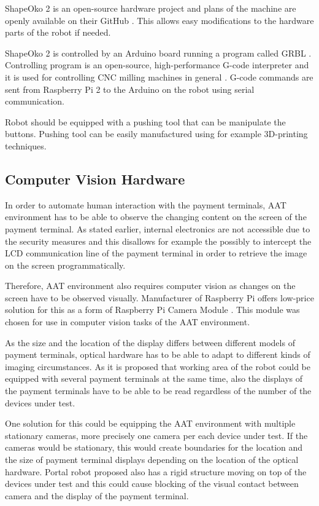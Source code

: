 ShapeOko 2 is an open-source hardware project and plans of the machine are openly available on their GitHub \citep{shapeoko_git}. This allows easy modifications to the hardware parts of the robot if needed.

ShapeOko 2 is controlled by an Arduino board running a program called GRBL \citep{grbl}. Controlling program is an open-source, high-performance G-code interpreter and it is used for controlling CNC milling machines in general \citep{shapeoko}. G-code commands are sent from Raspberry Pi 2 to the Arduino on the robot using serial communication.

Robot should be equipped with a pushing tool that can be manipulate the buttons. Pushing tool can be easily manufactured using for example 3D-printing techniques.

\FloatBarrier
\subsection{Computer Vision Hardware}
\label{subsection:computer vision hardware}

In order to automate human interaction with the payment terminals, AAT environment has to be able to observe the changing content on the screen of the payment terminal. As stated earlier, internal electronics are not accessible due to the security measures and this disallows for example the possibly to intercept the LCD communication line of the payment terminal in order to retrieve the image on the screen programmatically.

Therefore, AAT environment also requires computer vision as changes on the screen have to be observed visually. Manufacturer of Raspberry Pi offers low-price solution for this as a form of Raspberry Pi Camera Module \citep{raspberry_camera}. This module was chosen for use in computer vision tasks of the AAT environment.

As the size and the location of the display differs between different models of payment terminals, optical hardware has to be able to adapt to different kinds of imaging circumstances. As it is proposed that working area of the robot could be equipped with several payment terminals at the same time, also the displays of the payment terminals have to be able to be read regardless of the number of the devices under test.

One solution for this could be equipping the AAT environment with multiple stationary cameras, more precisely one camera per each device under test. If the cameras would be stationary, this would create boundaries for the location and the size of payment terminal displays depending on the location of the optical hardware. Portal robot proposed also has a rigid structure moving on top of the devices under test and this could cause blocking of the visual contact between camera and the display of the payment terminal.


